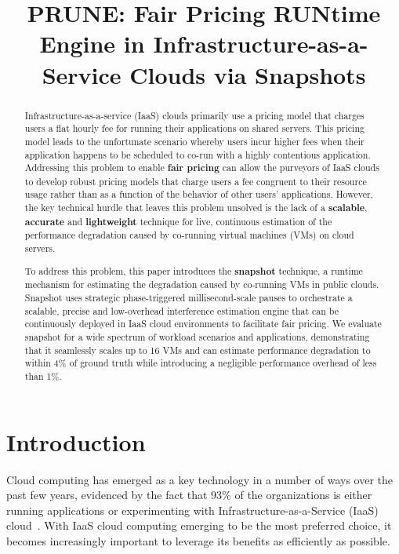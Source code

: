 \documentclass{sig-alternate}
\title{PRUNE: Fair Pricing RUNtime Engine in Infrastructure-as-a-Service Clouds via Snapshots}
\author{}
\begin{document}
\maketitle
\thispagestyle{firstpage}
\pagestyle{plain}
\begin{abstract}

Infrastructure-as-a-service (IaaS) clouds primarily use a pricing model that charges users a flat hourly fee for running their applications on shared servers. This pricing model leads to the unfortunate scenario whereby users incur higher fees when their application happens to be scheduled to co-run with a highly contentious application.  Addressing this problem to enable \textbf{fair pricing} can allow the purveyors of IaaS clouds to develop robust pricing models that charge users a fee congruent to their resource usage rather than as a function of the behavior of other users' applications. However, the key technical hurdle that leaves this problem unsolved is the lack of a \textbf{scalable}, \textbf{accurate} and \textbf{lightweight} technique for live, continuous estimation of the performance degradation caused by co-running virtual machines (VMs) on cloud servers.


To address this problem, this paper introduces the \textbf{snapshot} technique, a runtime mechanism for estimating the degradation caused by co-running VMs in public clouds. Snapshot uses strategic phase-triggered millisecond-scale pauses to orchestrate a scalable, precise and low-overhead interference estimation engine that can be continuously deployed in IaaS cloud environments to facilitate fair pricing. We evaluate snapshot for a wide spectrum of workload scenarios and applications, demonstrating that it seamlessly scales up to 16 VMs and can estimate performance degradation to within 4\% of ground truth while introducing a negligible performance overhead of less than 1\%.

\end{abstract}
\section{Introduction}
\label{sec:Introduction}

Cloud computing has emerged as a key technology in a number of ways over the past few years, evidenced by the fact that 93\% of the organizations is either running applications or experimenting with Infrastructure-as-a-Service (IaaS) cloud~\cite{forbes}. With IaaS cloud computing emerging to be the most preferred choice, it becomes increasingly important to leverage its benefits as efficiently as possible.
\end{document}
